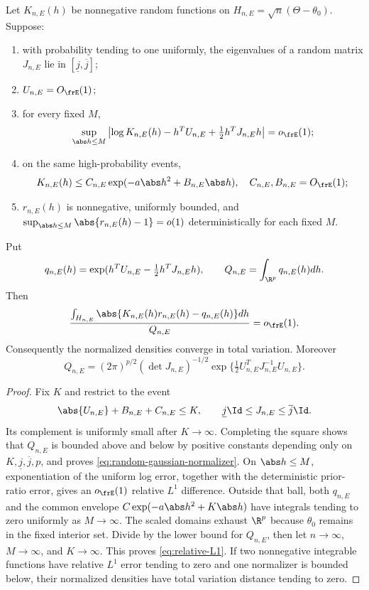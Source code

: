 \begin{lemma}
\label{lem:random-laplace}
Let \(K_{n,E}(h)\) be nonnegative random functions on
\(H_{n,E}=\sqrt n(\Theta-\theta_0)\).  Suppose:
\begin{enumerate}
\item with probability tending to one uniformly, the eigenvalues of a random
matrix \(J_{n,E}\) lie in \([\underline j,\overline j]\);
\item \(U_{n,E}=O_{\frE}(1)\);
\item for every fixed \(M\),
\[
 \sup_{\abs h\le M}\left|
 \log K_{n,E}(h)-h^TU_{n,E}+\tfrac12h^TJ_{n,E}h
 \right|=o_{\frE}(1);
\]
\item on the same high-probability events,
\[
 K_{n,E}(h)\le
 C_{n,E}\exp(-a\abs h^2+B_{n,E}\abs h),
 \quad C_{n,E},B_{n,E}=O_{\frE}(1);
\]
\item \(r_{n,E}(h)\) is nonnegative, uniformly bounded, and
\(\sup_{\abs h\le M}\abs{r_{n,E}(h)-1}=o(1)\) deterministically for each
fixed \(M\).
\end{enumerate}
Put
\[
 q_{n,E}(h)=\exp(h^TU_{n,E}-\tfrac12h^TJ_{n,E}h),
 \qquad
 Q_{n,E}=\int_{\R^p}q_{n,E}(h)dh.
\]
Then
\begin{equation}
 \frac{\int_{H_{n,E}}
 \abs{K_{n,E}(h)r_{n,E}(h)-q_{n,E}(h)}dh}
 {Q_{n,E}}=o_{\frE}(1).
 \label{eq:relative-L1}
\end{equation}
Consequently the normalized densities converge in total variation.  Moreover
\begin{equation}
 Q_{n,E}=(2\pi)^{p/2}(\det J_{n,E})^{-1/2}
 \exp\{\tfrac12U_{n,E}^TJ_{n,E}^{-1}U_{n,E}\}.
 \label{eq:random-gaussian-normalizer}
\end{equation}
\end{lemma}

\begin{proof}
Fix \(K\) and restrict to the event
\[
 \abs{U_{n,E}}+B_{n,E}+C_{n,E}\le K,
 \qquad
 \underline j\Id\le J_{n,E}\le\overline j\Id.
\]
Its complement is uniformly small after \(K\to\infty\).  Completing the
square shows that \(Q_{n,E}\) is bounded above and below by positive
constants depending only on \(K,\underline j,\overline j,p\), and proves
\eqref{eq:random-gaussian-normalizer}.  On \(\abs h\le M\), exponentiation of
the uniform log error, together with the deterministic prior-ratio error,
gives an \(o_{\frE}(1)\) relative \(L^1\) difference.  Outside that ball,
both \(q_{n,E}\) and the common envelope
\(C\exp(-a\abs h^2+K\abs h)\) have integrals tending to zero uniformly as
\(M\to\infty\).  The scaled domains exhaust \(\R^p\) because
\(\theta_0\) remains in the fixed interior set.  Divide by the lower bound
for \(Q_{n,E}\), then let \(n\to\infty\), \(M\to\infty\), and
\(K\to\infty\).  This proves \eqref{eq:relative-L1}.  If two nonnegative
integrable functions have relative \(L^1\) error tending to zero and one
normalizer is bounded below, their normalized densities have total variation
distance tending to zero.
\end{proof}

